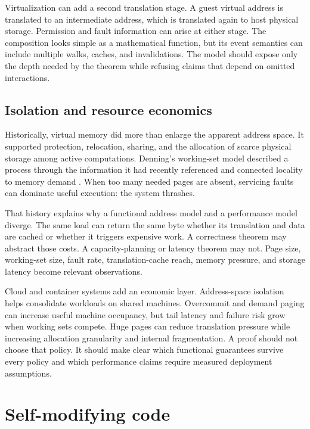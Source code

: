 Virtualization can add a second translation stage. A guest virtual address is
translated to an intermediate address, which is translated again to host
physical storage. Permission and fault information can arise at either stage.
The composition looks simple as a mathematical function, but its event
semantics can include multiple walks, caches, and invalidations. The model
should expose only the depth needed by the theorem while refusing claims that
depend on omitted interactions.

\subsection{Isolation and resource economics}

Historically, virtual memory did more than enlarge the apparent address space.
It supported protection, relocation, sharing, and the allocation of scarce
physical storage among active computations. Denning's working-set model
described a process through the information it had recently referenced and
connected locality to memory demand \autocite{denning1968workingset}. When too
many needed pages are absent, servicing faults can dominate useful execution:
the system thrashes.

That history explains why a functional address model and a performance model
diverge. The same load can return the same byte whether its translation and
data are cached or whether it triggers expensive work. A correctness theorem
may abstract those costs. A capacity-planning or latency theorem may not. Page
size, working-set size, fault rate, translation-cache reach, memory pressure,
and storage latency become relevant observations.

Cloud and container systems add an economic layer. Address-space isolation
helps consolidate workloads on shared machines. Overcommit and demand paging
can increase useful machine occupancy, but tail latency and failure risk grow when working
sets compete. Huge pages can reduce translation pressure while increasing
allocation granularity and internal fragmentation. A proof should not choose
that policy. It should make clear which functional guarantees survive every
policy and which performance claims require measured deployment assumptions.

\section{Self-modifying code}

